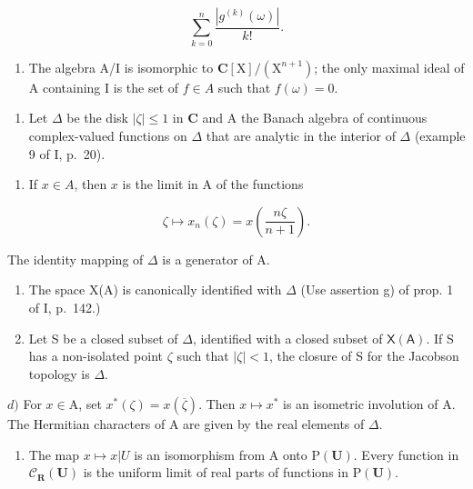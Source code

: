 \[
\sum_ {k = 0} ^ {n} \frac {| g ^ {(k)} (\omega) |}{k !}.
\]

\begin{enumerate}
\def\labelenumi{\alph{enumi})}
\setcounter{enumi}{2}
\tightlist
\item
  The algebra A/I is isomorphic to \(\mathbf{C}[\mathrm{X}]/(\mathrm{X}^{n+1})\); the only maximal ideal of A containing I is the set of \(f \in A\) such that \(f(\omega) = 0\).
\end{enumerate}

\begin{enumerate}
\def\labelenumi{\arabic{enumi})}
\setcounter{enumi}{5}
\tightlist
\item
  Let \(\Delta\) be the disk \(|\zeta| \leqslant 1\) in \(\mathbf{C}\) and A the Banach algebra of continuous complex-valued functions on \(\Delta\) that are analytic in the interior of \(\Delta\) (example 9 of I, p.~20).
\end{enumerate}

\begin{enumerate}
\def\labelenumi{\alph{enumi})}
\tightlist
\item
  If \(x \in A\), then \(x\) is the limit in A of the functions
\end{enumerate}

\[
\zeta \mapsto x _ {n} (\zeta) = x \left(\frac {n \zeta}{n + 1}\right).
\]

The identity mapping of \(\Delta\) is a generator of A.

\begin{enumerate}
\def\labelenumi{\alph{enumi})}
\setcounter{enumi}{1}
\item
  The space X(A) is canonically identified with \(\Delta\) (Use assertion g) of prop. 1 of I, p.~142.)
\item
  Let S be a closed subset of \(\Delta\), identified with a closed subset of \(\mathsf{X}(\mathsf{A})\). If S has a non-isolated point \(\zeta\) such that \(|\zeta| < 1\), the closure of S for the Jacobson topology is \(\Delta\).
\end{enumerate}

\(d)\) For \(x \in \mathrm{A}\), set \(x^{*}(\zeta) = x(\overline{\zeta})\). Then \(x \mapsto x^{*}\) is an isometric involution of A. The Hermitian characters of A are given by the real elements of \(\Delta\).

\begin{enumerate}
\def\labelenumi{\alph{enumi})}
\setcounter{enumi}{4}
\tightlist
\item
  The map \(x \mapsto x|U\) is an isomorphism from A onto \(\mathrm{P}(\mathbf{U})\). Every function in \(\mathcal{C}_{\mathbf{R}}(\mathbf{U})\) is the uniform limit of real parts of functions in \(\mathrm{P}(\mathbf{U})\).
\end{enumerate}

